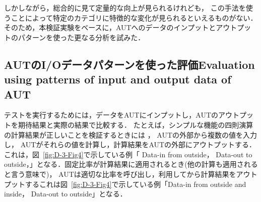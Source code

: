 \documentclass[a4paper,12pt]{jreport}
\begin{document}
しかしながら，総合的に見て定量的な向上が見られるけれども， この手法を使うことによって特定のカテゴリに特徴的な変化が見られるといえるものがない．そのため，本検証実験をベースに，AUTへのデータのインプットとアウトプットのパターンを使った更なる分析を試みた．

\subsection{AUTのI/Oデータパターンを使った評価Evaluation using patterns of input and output data of AUT}


 テストを実行するためには，データをAUTにインプットし，AUTのアウトプットを期待結果と実際の結果で比較する．
 たとえば，シンプルな機能の四則演算の計算結果が正しいことを検証するときには ， AUTの外部から複数の値を入力し， AUTがそれらの値を計算し，計算結果をAUTの外部にアウトプットする．
 これは，図~\ref{fig:D-3-Fig4}で示している例「 Data-in from outside， Data-out to outside，」となる．固定比率が計算結果に適用されるとき(他の計算も適用されると言う意味で)， AUTは適切な比率を呼び出し，利用してから計算結果をアウトプットするこれは図~\ref{fig:D-3-Fig4}で示している例「Data-in from outside 	and  inside， Data-out to outside」となる．
\end{document}
